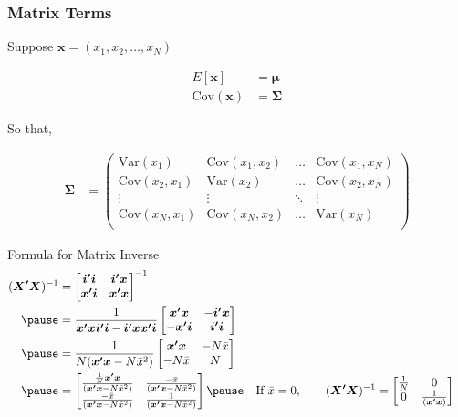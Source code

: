 \documentclass[aspectratio=169, handout]{beamer}
\numberwithin{equation}{section}
\begin{document}
\begin{frame}
\frametitle{Matrix Terms}

Suppose $\boldsymbol{x} = (x_{1}, x_{2}, \hdots, x_{N} ) $

\begin{align*}
E[\boldsymbol{x} ] & =   \boldsymbol{\mu} \\
\text{Cov}(\boldsymbol{x} ) & =  \boldsymbol{\Sigma} 
\end{align*}

So that, 

\begin{align*}
\boldsymbol{\Sigma}  & =  \begin{pmatrix} 
\text{Var}(x_{1}) & \text{Cov}(x_{1}, x_{2}) & \hdots & \text{Cov}(x_{1}, x_{N}) \\
\text{Cov}(x_{2}, x_{1}) & \text{Var}(x_{2}) & \hdots & \text{Cov}(x_{2}, x_{N} ) \\
\vdots & \vdots & \ddots & \vdots \\
\text{Cov}(x_{N}, x_{1} ) & \text{Cov}(x_{N}, x_{2} ) & \hdots & \text{Var}(x_{N} ) \\
\end{pmatrix}
\end{align*}

\end{frame}


\begin{frame}{Formula for Matrix Inverse}
\begin{align*}
(\bm{X'X})^{-1}&=\begin{bmatrix} \bm{i'i}&\bm{i'x}\\\bm{x'i}&\bm{x'x}\end{bmatrix}^{-1}\\ \pause
&=\frac{1}{\bm{x'x}\bm{i'i}-\bm{i'x}\bm{x'i}} \begin{bmatrix} \bm{x'x} &-\bm{i'x}\\-\bm{x'i}&\bm{i'i}\end{bmatrix}\\ \pause
&=\frac{1}{N(\bm{x'x}-N\bar{x}^2)} \begin{bmatrix} \bm{x'x} &-N\bar{x}\\-N\bar{x}&N\end{bmatrix}\\ \pause
&=\begin{bmatrix} \frac{\frac{1}{N}\bm{x'x}}{(\bm{x'x}-N\bar{x}^2)} &\frac{-\bar{x}}{(\bm{x'x}-N\bar{x}^2)}\\ \frac{-\bar{x}}{(\bm{x'x}-N\bar{x}^2)}&\frac{1}{(\bm{x'x}-N\bar{x}^2)}\end{bmatrix} \pause &&\text{If }\bar{x}=0, \quad \quad (\bm{X'X})^{-1}=\begin{bmatrix}\frac{1}{N} &0\\ 0&\frac{1}{(\bm{x'x})}\end{bmatrix}
\end{align*}
\end{frame}
\end{document}
